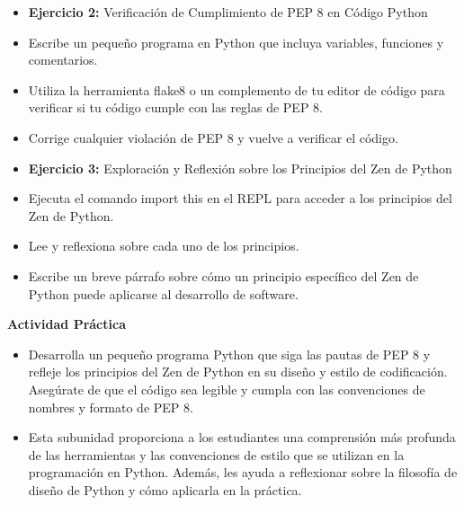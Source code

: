 \documentclass[
  a4paper,
  DIV=11,
  numbers=noendperiod,
  onepage,
  openany]{scrreprt}
\begin{document}
\begin{itemize}
\item
  \textbf{Ejercicio 2:} Verificación de Cumplimiento de PEP 8 en Código
  Python
\item
  Escribe un pequeño programa en Python que incluya variables, funciones
  y comentarios.
\item
  Utiliza la herramienta flake8 o un complemento de tu editor de código
  para verificar si tu código cumple con las reglas de PEP 8.
\item
  Corrige cualquier violación de PEP 8 y vuelve a verificar el código.
\item
  \textbf{Ejercicio 3:} Exploración y Reflexión sobre los Principios del
  Zen de Python
\item
  Ejecuta el comando import this en el REPL para acceder a los
  principios del Zen de Python.
\item
  Lee y reflexiona sobre cada uno de los principios.
\item
  Escribe un breve párrafo sobre cómo un principio específico del Zen de
  Python puede aplicarse al desarrollo de software.
\end{itemize}

\begin{tcolorbox}[enhanced jigsaw, toptitle=1mm, toprule=.15mm, title=\textcolor{quarto-callout-tip-color}{\faLightbulb}\hspace{0.5em}{Tip}, colbacktitle=quarto-callout-tip-color!10!white, opacitybacktitle=0.6, titlerule=0mm, colback=white, left=2mm, bottomrule=.15mm, breakable, bottomtitle=1mm, rightrule=.15mm, colframe=quarto-callout-tip-color-frame, arc=.35mm, leftrule=.75mm, coltitle=black, opacityback=0]

\textbf{Actividad Práctica}

\begin{itemize}
\item
  Desarrolla un pequeño programa Python que siga las pautas de PEP 8 y
  refleje los principios del Zen de Python en su diseño y estilo de
  codificación. Asegúrate de que el código sea legible y cumpla con las
  convenciones de nombres y formato de PEP 8.
\item
  Esta subunidad proporciona a los estudiantes una comprensión más
  profunda de las herramientas y las convenciones de estilo que se
  utilizan en la programación en Python. Además, les ayuda a reflexionar
  sobre la filosofía de diseño de Python y cómo aplicarla en la
  práctica.
\end{itemize}

\end{tcolorbox}
\end{document}

